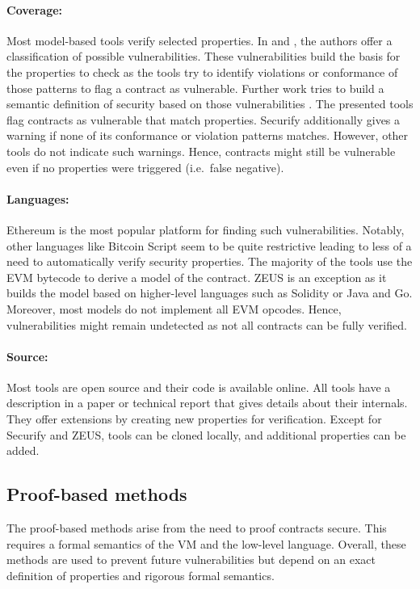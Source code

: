 \documentclass{llncs}
\begin{document}
\paragraph{Coverage:} Most model-based tools verify selected properties. In \cite{Atzei2017} and \cite{Luu2016}, the authors offer a classification of possible vulnerabilities. These vulnerabilities build the basis for the properties to check as the tools try to identify violations or conformance of those patterns to flag a contract as vulnerable. Further work tries to build a semantic definition of security based on those vulnerabilities \cite{Grishchenko2018}. The presented tools flag contracts as vulnerable that match properties. Securify additionally gives a warning if none of its conformance or violation patterns matches. However, other tools do not indicate such warnings. Hence, contracts might still be vulnerable even if no properties were triggered (i.e.\ false negative).

\paragraph{Languages:} Ethereum is the most popular platform for finding such vulnerabilities. Notably, other languages like Bitcoin Script seem to be quite restrictive leading to less of a need to automatically verify security properties. The majority of the tools use the EVM bytecode to derive a model of the contract. ZEUS is an exception as it builds the model based on higher-level languages such as Solidity or Java and Go. Moreover, most models do not implement all EVM opcodes. Hence, vulnerabilities might remain undetected as not all contracts can be fully verified.

\paragraph{Source:} Most tools are open source and their code is available online. All tools have a description in a paper or technical report that gives details about their internals. They offer extensions by creating new properties for verification. Except for Securify and ZEUS, tools can be cloned locally, and additional properties can be added.


\subsection{Proof-based methods}
The proof-based methods arise from the need to proof contracts secure. This requires a formal semantics of the VM and the low-level language. Overall, these methods are used to prevent future vulnerabilities but depend on an exact definition of properties and rigorous formal semantics.
\end{document}

